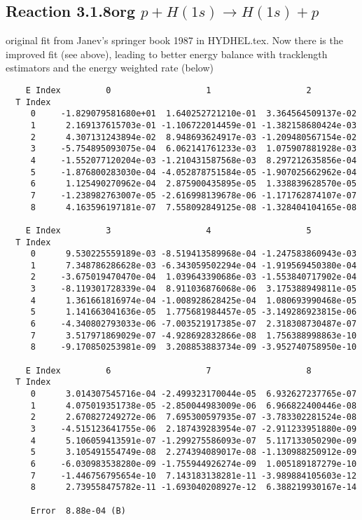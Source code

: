 \documentclass[12pt,dvipdfmx]{article}
\begin{document}
\subsection{
Reaction 3.1.8org $ p + H(1s) \rightarrow H(1s) + p   $
}
original fit from Janev's springer book 1987
in HYDHEL.tex. Now there is the improved fit (see above), leading to better
energy balance with tracklength estimators and the energy weighted rate (below)

\begin{small}\begin{verbatim}
    E Index         0                   1                   2
  T Index
     0     -1.829079581680e+01  1.640252721210e-01  3.364564509137e-02
     1      2.169137615703e-01 -1.106722014459e-01 -1.382158680424e-03
     2      4.307131243894e-02  8.948693624917e-03 -1.209480567154e-02
     3     -5.754895093075e-04  6.062141761233e-03  1.075907881928e-03
     4     -1.552077120204e-03 -1.210431587568e-03  8.297212635856e-04
     5     -1.876800283030e-04 -4.052878751584e-05 -1.907025662962e-04
     6      1.125490270962e-04  2.875900435895e-05  1.338839628570e-05
     7     -1.238982763007e-05 -2.616998139678e-06 -1.171762874107e-07
     8      4.163596197181e-07  7.558092849125e-08 -1.328404104165e-08

    E Index         3                   4                   5
  T Index
     0      9.530225559189e-03 -8.519413589968e-04 -1.247583860943e-03
     1      7.348786286628e-03 -6.343059502294e-04 -1.919569450380e-04
     2     -3.675019470470e-04  1.039643390686e-03 -1.553840717902e-04
     3     -8.119301728339e-04  8.911036876068e-06  3.175388949811e-05
     4      1.361661816974e-04 -1.008928628425e-04  1.080693990468e-05
     5      1.141663041636e-05  1.775681984457e-05 -3.149286923815e-06
     6     -4.340802793033e-06 -7.003521917385e-07  2.318308730487e-07
     7      3.517971869029e-07 -4.928692832866e-08  1.756388998863e-10
     8     -9.170850253981e-09  3.208853883734e-09 -3.952740758950e-10

    E Index         6                   7                   8
  T Index
     0      3.014307545716e-04 -2.499323170044e-05  6.932627237765e-07
     1      4.075019351738e-05 -2.850044983009e-06  6.966822400446e-08
     2      2.670827249272e-06  7.695300597935e-07 -3.783302281524e-08
     3     -4.515123641755e-06  2.187439283954e-07 -2.911233951880e-09
     4      5.106059413591e-07 -1.299275586093e-07  5.117133050290e-09
     5      3.105491554749e-08  2.274394089017e-08 -1.130988250912e-09
     6     -6.030983538280e-09 -1.755944926274e-09  1.005189187279e-10
     7     -1.446756795654e-10  7.143183138281e-11 -3.989884105603e-12
     8      2.739558475782e-11 -1.693040208927e-12  6.388219930167e-14

     Error  8.88e-04 (B)
\end{verbatim}\end{small}
\end{document}
